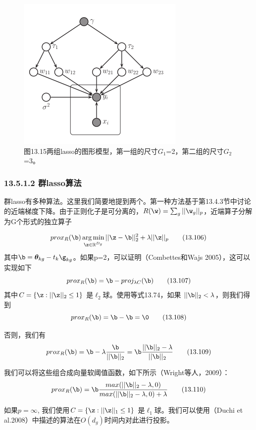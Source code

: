 \documentclass[a4paper]{article}
\DeclareMathOperator*{\argmin}{arg\,min}
\begin{document}
\begin{figure}[h]
	\centering
	\includegraphics[width=0.4\linewidth]{fig13/figure15}
	\caption*{图13.15两组lasso的图形模型，第一组的尺寸$G_1$=2，第二组的尺寸$G_2$=3。}
\end{figure}

\subsubsection*{13.5.1.2 群lasso算法}
群lasso有多种算法。这里我们简要地提到两个。第一种方法基于第13.4.3节中讨论的近端梯度下降。由于正则化子是可分离的，$R(\w)=\sum\nolimits_{g}||\w_g||_p$，近端算子分解为G个形式的独立算子

\begin{equation}
	prox_R(\b)\argmin_{\z\in \mathbb{R}^{D_g}}||\z-\b||_2^2+\lambda||\z||_p\tag{13.106}
\end{equation}
其中$\b=\boldsymbol{\theta}_{kg}-t_k\g_{kg}$。如果p=2，可以证明（Combettes和Wajs 2005），这可以实现如下
\begin{equation}
prox_R(\b)=\b -proj_{\lambda C}(\b)\tag{13.107}
\end{equation}
其中$C=\{\z:||\z||_2\le 1\}$ 是$\ell_2$球。使用等式13.74，如果
$||\b||_2<\lambda$，则我们得到
\begin{equation}
	prox_R(\b)=\b-\b=\0\tag{13.108}
\end{equation}

否则，我们有
\begin{equation}
	prox_R(\b)=\b-\lambda\frac{\b}{||\b||_2}=\b\frac{||\b||_2-\lambda}{||\b||_2}\tag{13.109}
\end{equation}

我们可以将这些组合成向量软阈值函数，如下所示（Wright等人，2009）：
\begin{equation}
	prox_R(\b)=\b\dfrac{max(||\b||_2-\lambda,0)}{max(||\b||_2-\lambda,0)+\lambda}\tag{13.110}
\end{equation}

如果$p=\infty$, 我们使用$C=\{\z:||\z||_1\le 1\}$ 是$\ell_1$球。我们可以使用（Duchi et al.2008）中描述的算法在$O(d_g)$时间内对此进行投影。
\end{document}
